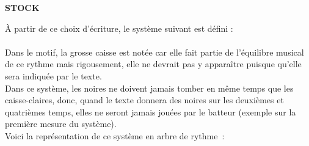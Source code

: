 \newpage
\textbf{STOCK}

À partir de ce choix d’écriture, le système suivant est défini :\\\\
Dans le motif, la grosse caisse est notée car elle fait partie de l’équilibre musical de ce rythme mais rigousement, elle ne devrait pas y apparaître puisque qu’elle sera indiquée par le texte.\\
Dans ce système, les noires ne doivent jamais tomber en même temps que les caisse-claires, donc, quand le texte donnera des noires sur les deuxièmes et quatrièmes temps, elles ne seront jamais jouées par le batteur (exemple sur la première mesure du système).\\


Voici la représentation de ce système en arbre de rythme :\\

\\

